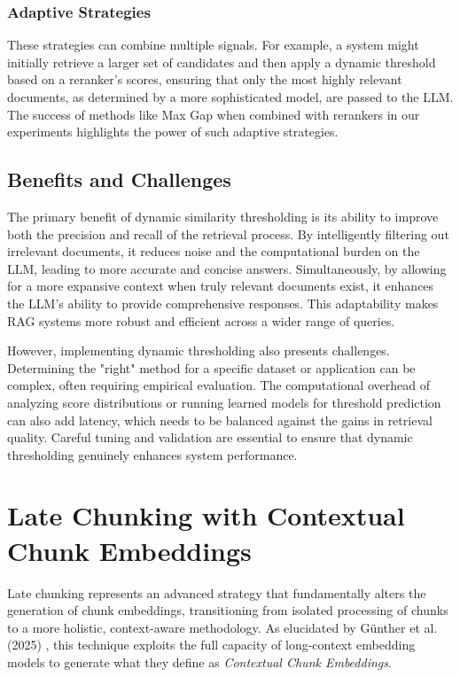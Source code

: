 \subsubsection{Adaptive Strategies}
These strategies can combine multiple signals. For example, a system might initially retrieve a larger set of candidates and then apply a dynamic threshold based on a reranker's scores, ensuring that only the most highly relevant documents, as determined by a more sophisticated model, are passed to the LLM. The success of methods like Max Gap when combined with rerankers in our experiments highlights the power of such adaptive strategies.

\subsection{Benefits and Challenges}
The primary benefit of dynamic similarity thresholding is its ability to improve both the precision and recall of the retrieval process. By intelligently filtering out irrelevant documents, it reduces noise and the computational burden on the LLM, leading to more accurate and concise answers. Simultaneously, by allowing for a more expansive context when truly relevant documents exist, it enhances the LLM's ability to provide comprehensive responses. This adaptability makes RAG systems more robust and efficient across a wider range of queries.

However, implementing dynamic thresholding also presents challenges. Determining the "right" method for a specific dataset or application can be complex, often requiring empirical evaluation. The computational overhead of analyzing score distributions or running learned models for threshold prediction can also add latency, which needs to be balanced against the gains in retrieval quality. Careful tuning and validation are essential to ensure that dynamic thresholding genuinely enhances system performance.

\section{Late Chunking with Contextual Chunk Embeddings}
Late chunking represents an advanced strategy that fundamentally alters the generation of chunk embeddings, transitioning from isolated processing of chunks to a more holistic, context-aware methodology. As elucidated by Günther et al. (2025) \autocite{günther2025latechunkingcontextualchunk}, this technique exploits the full capacity of long-context embedding models to generate what they define as \textit{Contextual Chunk Embeddings}.

